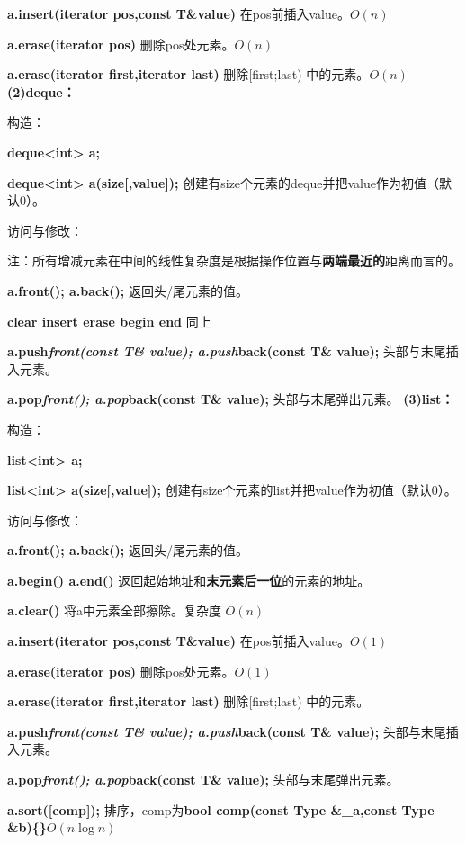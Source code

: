 \documentclass[a4paper,11pt]{article}
\begin{document}
\textbf{a.insert(iterator pos,const T\&value)}
在pos前插入value。\(O(n)\)

\textbf{a.erase(iterator pos) } 删除pos处元素。\(O(n)\)

\textbf{a.erase(iterator first,iterator last)} 删除{[}first;last)
中的元素。\(O(n)\)
\noindent\textbf{(2)deque：}

构造：

\textbf{deque\textless{}int\textgreater{} a; }

\textbf{deque\textless{}int\textgreater{} a(size{[},value{]});}
创建有size个元素的deque并把value作为初值（默认0）。

访问与修改：

注：所有增减元素在中间的线性复杂度是根据操作位置与\textbf{两端最近的}距离而言的。

\textbf{a.front(); a.back();} 返回头/尾元素的值。

\textbf{clear insert erase begin end} 同上

\textbf{a.push\emph{front(const T\& value); a.push}back(const T\&
value);} 头部与末尾插入元素。

\textbf{a.pop\emph{front(); a.pop}back(const T\& value);}
头部与末尾弹出元素。
\noindent\textbf{(3)list：}

构造：

\textbf{list\textless{}int\textgreater{} a; }

\textbf{list\textless{}int\textgreater{} a(size{[},value{]});}
创建有size个元素的list并把value作为初值（默认0）。

访问与修改：

\textbf{a.front(); a.back();} 返回头/尾元素的值。

\textbf{a.begin() a.end()}
返回起始地址和\textbf{末元素后一位}的元素的地址。

\textbf{a.clear()} 将a中元素全部擦除。复杂度 \(O(n)\)

\textbf{a.insert(iterator pos,const T\&value)}
在pos前插入value。\(O(1)\)

\textbf{a.erase(iterator pos) } 删除pos处元素。\(O(1)\)

\textbf{a.erase(iterator first,iterator last)} 删除{[}first;last)
中的元素。

\textbf{a.push\emph{front(const T\& value); a.push}back(const T\&
value);} 头部与末尾插入元素。

\textbf{a.pop\emph{front(); a.pop}back(const T\& value);}
头部与末尾弹出元素。

\textbf{a.sort({[}comp{]});} 排序，comp为\textbf{bool comp(const Type
\&\_a,const Type \&b)\{\}}\(O(n\log n)\)
\end{document}
